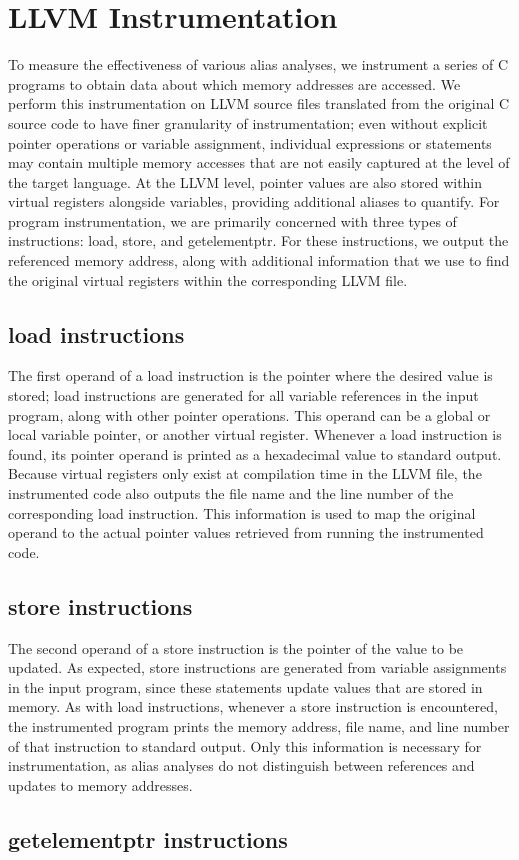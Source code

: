 \section{LLVM Instrumentation}
To measure the effectiveness of various alias analyses, we instrument a series of C programs to obtain data about which memory addresses are accessed. We perform this instrumentation on LLVM source files translated from the original C source code to have finer granularity of instrumentation; even without explicit pointer operations or variable assignment, individual expressions or statements may contain multiple memory accesses that are not easily captured at the level of the target language. At the LLVM level, pointer values are also stored within virtual registers alongside variables, providing additional aliases to quantify. For program instrumentation, we are primarily concerned with three types of instructions: load, store, and getelementptr. For these instructions, we output the referenced memory address, along with additional information that we use to find the original virtual registers within the corresponding LLVM file.

\subsection{load instructions}
The first operand of a load instruction is the pointer where the desired value is stored; load instructions are generated for all variable references in the input program, along with other pointer operations. This operand can be a global or local variable pointer, or another virtual register. Whenever a load instruction is found, its pointer operand is printed as a hexadecimal value to standard output. Because virtual registers only exist at compilation time in the LLVM file, the instrumented code also outputs the file name and the line number of the corresponding load instruction. This information is used to map the original operand to the actual pointer values retrieved from running the instrumented code.

\subsection{store instructions}
The second operand of a store instruction is the pointer of the value to be updated. As expected, store instructions are generated from variable assignments in the input program, since these statements update values that are stored in memory. As with load instructions, whenever a store instruction is encountered, the instrumented program prints the memory address, file name, and line number of that instruction to standard output. Only this information is necessary for instrumentation, as alias analyses do not distinguish between references and updates to memory addresses.

\subsection{getelementptr instructions}
